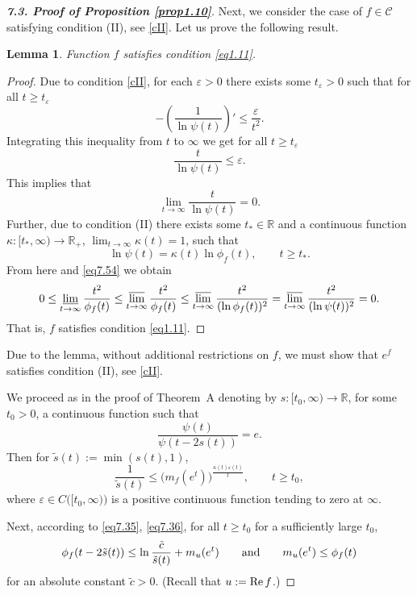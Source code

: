 \documentclass[11pt, oneside]{amsart}
\newtheorem{Lm}[Th]{Lemma}
\begin{document}
\begin{proof}[{\bf 7.3. Proof of Proposition \ref{prop1.10}}]
Next, we consider the case of $f\in\mathscr C$ satisfying condition (II), see \eqref{cII}.  Let us prove the following result.
\begin{Lm}\label{lemma7.2}
Function $f$ satisfies condition \eqref{eq1.11}.
\end{Lm}
\begin{proof}
Due to condition \eqref{cII}, for each $\varepsilon>0$ there exists some $t_\varepsilon>0$ such that for all $t\ge t_\varepsilon$
\[
-\left(\frac{1}{\ln\psi(t)}\right)'\le \frac{\varepsilon}{t^2}.
\]
Integrating this inequality from $t$ to $\infty$ we get for all $t\ge t_\varepsilon$
\[
\frac{t}{\ln\psi(t)}\le \varepsilon.
\]
This implies that
\begin{equation}\label{eq7.54}
\lim_{t\rightarrow\infty}\frac{t}{\ln\psi(t)}=0.
\end{equation}
Further, due to condition (II) there exists some $t_*\in\mathbb R$ and a continuous function $\kappa : [t_*,\infty)\rightarrow \mathbb R_+$, $\lim_{t\rightarrow\infty}\kappa(t)=1$, such that
\begin{equation}\label{eq7.55}
\ln\psi(t)=\kappa(t)\ln\phi_f(t),\qquad t\ge t_*.
\end{equation}
From here and \eqref{eq7.54} we obtain
\[
0\le\varliminf_{t\rightarrow\infty}\frac{t^2}{\phi_f(t)}\le \varlimsup_{t\rightarrow\infty}\frac{t^2}{\phi_f(t)}\le \varlimsup_{t\rightarrow\infty}\frac{t^2}{(\ln\phi_f(t))^2}=
 \varlimsup_{t\rightarrow\infty}\frac{t^2}{(\ln\psi(t))^2}=0.
\]
That is, $f$ satisfies condition \eqref{eq1.11}.
\end{proof}
Due to the lemma, without additional restrictions on $f$, we must show that $e^f$ satisfies condition (II), see \eqref{cII}.  

We proceed as in the proof of Theorem~A  denoting by $s: [t_0,\infty)\rightarrow\mathbb R$, for some $t_0>0$, a continuous function
such that
\begin{equation}\label{eq7.56}
\frac{\psi(t)}{\psi(t-2s(t))}=e.
\end{equation}
Then for $\tilde s(t):=\min(s(t),1)$,
\begin{equation}\label{eq7.57}
\frac{1}{\tilde s(t)}\le \bigl(m_f(e^t)\bigr)^{\frac{\kappa(t)\varepsilon(t)}{t}},\qquad t\ge t_0,
\end{equation}
where $\varepsilon\in C\bigl([t_0,\infty)\bigr)$ is a positive continuous function tending to zero at $\infty$.

Next, according to \eqref{eq7.35}, \eqref{eq7.36}, for all  $t\ge t_0$ for a sufficiently large $t_0$,
\[
\phi_f(t-2\tilde s(t))\le \ln\frac{\tilde c}{\tilde s(t)}+m_u(e^t)\qquad {\rm and}\qquad m_u(e^t)\le\phi_f(t)
\]
for an absolute constant  $\tilde c>0$. (Recall that $u:={\rm Re}\, f$.)


\end{proof}
\end{document}
